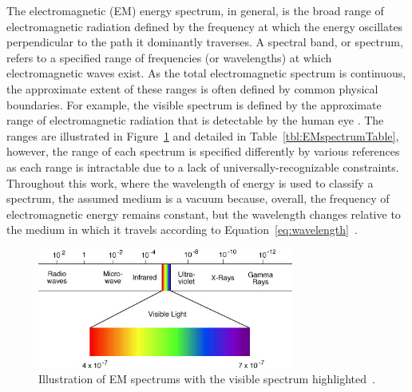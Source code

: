 The electromagnetic (EM) energy spectrum, in general, is the broad range of electromagnetic radiation defined by the frequency at which the energy oscillates perpendicular to the path it dominantly traverses. A spectral band, or spectrum, refers to a specified range of frequencies (or wavelengths) at which electromagnetic waves exist. As the total electromagnetic spectrum is continuous, the approximate extent of these ranges is often defined by common physical boundaries. For example, the visible spectrum is defined by the approximate range of electromagnetic radiation that is detectable by the human eye \cite{Hecht}. The ranges are illustrated in Figure~\ref{fig:EMspectrum} and detailed in Table~\ref{tbl:EMspectrumTable}, however, the range of each spectrum is specified differently by various references as each range is intractable due to a lack of universally-recognizable constraints. Throughout this work, where the wavelength of energy is used to classify a spectrum, the assumed medium is a vacuum because, overall, the frequency of electromagnetic energy remains constant, but the wavelength changes relative to the medium in which it travels according to Equation~\eqref{eq:wavelength}~\cite{Hecht}.

\begin{figure}[htb]		%
\centering
\includegraphics[width=0.75\textwidth]{images/chap1/EMspectrum}
\caption{Illustration of \acl{EM} spectrums with the visible spectrum highlighted~\cite{RedOrbit}.}
\label{fig:EMspectrum}
\end{figure}

